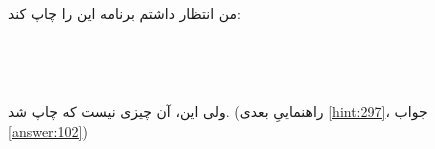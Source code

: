 \section{}
\paragraph{}\label{hint:139}
من انتظار داشتم برنامه این را چاپ کند:
\LTR\noindent
{}\\
\\
\\
\\
\\
\RTL
ولی این، آن چیزی نیست که چاپ شد. (راهنماییِ بعدی \ref{hint:297}، جواب \ref{answer:102})